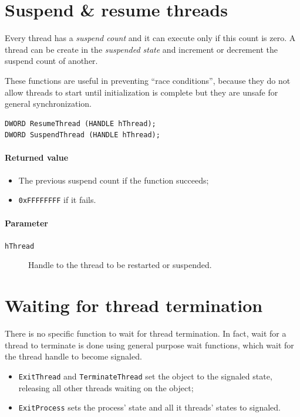 \section{Suspend \& resume threads}
Every thread has a \emph{suspend count} and it can execute only if this count is zero. A thread can be create in the \emph{suspended state} and increment or decrement the suspend count of another.

These functions are useful in preventing ``race conditions'', because they do not allow threads to start until initialization is complete but they are unsafe for general synchronization.

\begin{verbatim}
DWORD ResumeThread (HANDLE hThread);
DWORD SuspendThread (HANDLE hThread);
\end{verbatim}

\paragraph{Returned value}
\begin{itemize}
\item The previous suspend count if the function succeeds;
\item \texttt{0xFFFFFFFF} if it fails.
\end{itemize}

\paragraph{Parameter}
\begin{description}
\item [\texttt{hThread}] Handle to the thread to be restarted or suspended.
\end{description}

\section{Waiting for thread termination}
There is no specific function to wait for thread termination. In fact, wait for a thread to terminate is done using general purpose wait functions, which wait for the thread handle to become signaled.
\begin{itemize}
\item \texttt{ExitThread} and \texttt{TerminateThread} set the object to the signaled state, releasing all other threads waiting on the object;
\item \texttt{ExitProcess} sets the process' state and all it threads' states to signaled.
\end{itemize}

